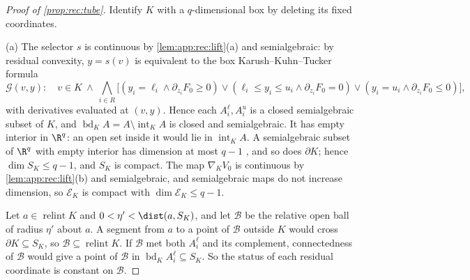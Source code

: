\begin{proof}[Proof of \cref{prop:rec:tube}]
Identify $K$ with a $q$-dimensional box by deleting its fixed coordinates.

(a) The selector $s$ is continuous by \cref{lem:app:rec:lift}(a) and
semialgebraic: by residual convexity, $y=s(v)$ is equivalent to the box
Karush--Kuhn--Tucker formula
\[
 \mathcal G(v,y):\quad v\in K\ \wedge\ \bigwedge_{i\in R}\bigl[
 (y_i=\ell_i\wedge\partial_{z_i}F_0\ge0)\vee(\ell_i\le y_i\le u_i\wedge
 \partial_{z_i}F_0=0)\vee(y_i=u_i\wedge\partial_{z_i}F_0\le0)\bigr],
\]
with derivatives evaluated at $(v,y)$. Hence each $A_i^\ell,A_i^u$ is a closed
semialgebraic subset of $K$, and $\operatorname{bd}_KA=A\setminus
\operatorname{int}_KA$ is closed and semialgebraic. It has empty interior in
$\R^q$: an open set inside it would lie in $\operatorname{int}_KA$. A
semialgebraic subset of $\R^q$ with empty interior has dimension at most $q-1$
\citep{basu2006-algorithms-in-real-algebraic-geometry}, and so does $\partial K$; hence
$\dim S_K\le q-1$, and $S_K$ is compact. The map $\nabla_KV_0$ is continuous
by \cref{lem:app:rec:lift}(b) and semialgebraic, and semialgebraic maps do not
increase dimension, so $\mathcal E_K$ is compact with $\dim\mathcal E_K\le q-1$.

Let $a\in\operatorname{relint}K$ and $0<\eta'<\dist(a,S_K)$, and let
$\mathcal B$ be the relative open ball of radius $\eta'$ about $a$. A segment
from $a$ to a point of $\mathcal B$ outside $K$ would cross $\partial K\subseteq
S_K$, so $\mathcal B\subseteq\operatorname{relint}K$. If $\mathcal B$ met both
$A_i^\ell$ and its complement, connectedness of $\mathcal B$ would give a
point of $\mathcal B$ in $\operatorname{bd}_KA_i^\ell\subseteq S_K$. So the
status of each residual coordinate is constant on $\mathcal B$.


\end{proof}
